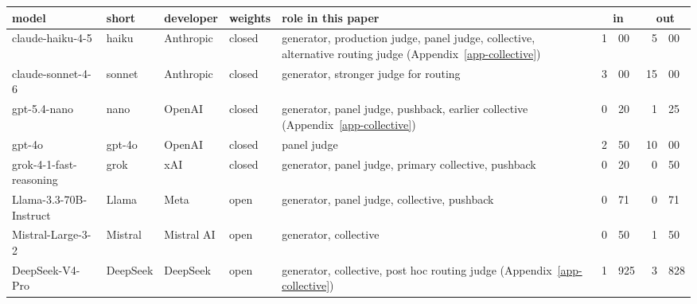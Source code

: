 \begin{table}[t]
{\begin{tabular}{llll>{\raggedright\arraybackslash}p{3.8cm}r@{.}lr@{.}l}
\cmidrule(l){6-9}
model & short & developer & weights & role in this paper & \multicolumn{2}{c}{in} & \multicolumn{2}{c}{out} \\
\midrule
claude-haiku-4-5 & haiku & Anthropic & closed & generator, production judge, panel judge, collective, alternative routing judge (Appendix~\ref{app-collective}) & 1&00 & 5&00 \\[2pt]
claude-sonnet-4-6 & sonnet & Anthropic & closed & generator, stronger judge for routing & 3&00 & 15&00 \\[2pt]
gpt-5.4-nano & nano & OpenAI & closed & generator, panel judge, pushback, earlier collective (Appendix~\ref{app-collective}) & 0&20 & 1&25 \\[2pt]
gpt-4o & gpt-4o & OpenAI & closed & panel judge & 2&50 & 10&00 \\[2pt]
grok-4-1-fast-reasoning & grok & xAI & closed & generator, panel judge, primary collective, pushback & 0&20 & 0&50 \\[2pt]
Llama-3.3-70B-Instruct & Llama & Meta & open & generator, panel judge, collective, pushback & 0&71 & 0&71 \\[2pt]
Mistral-Large-3-2 & Mistral & Mistral AI & open & generator, collective & 0&50 & 1&50 \\[2pt]
DeepSeek-V4-Pro & DeepSeek & DeepSeek & open & generator, collective, post hoc routing judge (Appendix~\ref{app-collective}) & 1&925 & 3&828 \\
\bottomrule
\end{tabular}}
\end{table}


